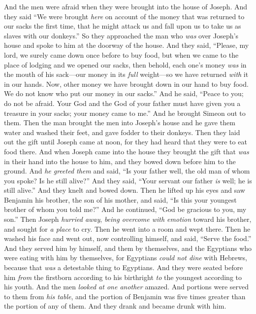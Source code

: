 \begin{biblechapter}
\verse And the men were afraid when they were brought into the house of Joseph. And they said “We were brought \textit{here} on account of the money that was returned to our sacks the first time, that he might attack us and fall upon us to take us as slaves with our donkeys.”
\verse So they approached the man who \textit{was} over Joseph’s house and spoke to him at the doorway of the house.
\verse And they said, “Please, my lord, we surely came down once before to buy food,
\verse but when we came to the place of lodging and we opened our sacks, then behold, each one’s money \textit{was} in the mouth of his sack—our money in its \textit{full} weight—so we have returned \textit{with} it in our hands.
\verse Now, other money we have brought down in our hand to buy food. We do not know who put our money in our sacks.”
\verse And he said, “Peace to you; do not be afraid. Your God and the God of your father must have given you a treasure in your sacks; your money came to me.” And he brought Simeon out to them.
\verse Then the man brought the men into Joseph’s house and he gave them water and washed their feet, and gave fodder to their donkeys.
\verse Then they laid out the gift until Joseph came at noon, for they had heard that they were to eat food there.
\verse And when Joseph came into the house they brought the gift that \textit{was} in their hand into the house to him, and they bowed down before him to the ground.
\verse And \textit{he greeted them} and said, “Is your father well, the old man of whom you spoke? Is he still alive?”
\verse And they said, “Your servant our father \textit{is} well; he is still alive.” And they knelt and bowed down.
\verse Then he lifted up his eyes and saw Benjamin his brother, the son of his mother, and said, “Is this your youngest brother of whom you told me?” And he continued, “God be gracious to you, my son.”
\verse Then Joseph \textit{hurried away}, \textit{being overcome with emotion} toward his brother, and sought for \textit{a place} to cry. Then he went into a room and wept there.
\verse Then he washed his face and went out, now controlling himself, and said, “Serve the food.”
\verse And they served him by himself, and them by themselves, and the Egyptians who were eating with him by themselves, for Egyptians \textit{could not dine} with Hebrews, because that \textit{was} a detestable thing to Egyptians.
\verse And they were seated before him \textit{from} the firstborn according to his birthright \textit{to} the youngest according to his youth. And the men \textit{looked at one another} amazed.
\verse And portions were served to them from \textit{his table}, and the portion of Benjamin was five times greater than the portion of any of them. And they drank and became drunk with him.
\end{biblechapter}

